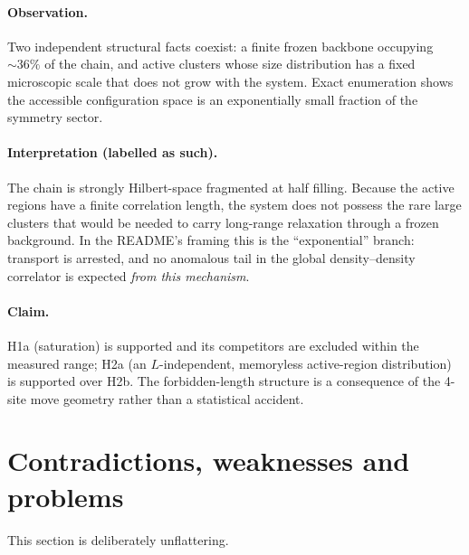 \documentclass[11pt,a4paper]{article}
\begin{document}
\paragraph{Observation.} Two independent structural facts coexist: a finite
frozen backbone occupying ${\sim}36\%$ of the chain, and active clusters
whose size distribution has a fixed microscopic scale that does not grow
with the system. Exact enumeration shows the accessible configuration space
is an exponentially small fraction of the symmetry sector.

\paragraph{Interpretation (labelled as such).} The chain is strongly
Hilbert-space fragmented at half filling. Because the active regions have a
finite correlation length, the system does not possess the rare large
clusters that would be needed to carry long-range relaxation through a
frozen background. In the README's framing this is the ``exponential''
branch: transport is arrested, and no anomalous tail in the global
density--density correlator is expected \emph{from this mechanism}.

\paragraph{Claim.} H1a (saturation) is supported and its competitors are
excluded within the measured range; H2a (an $L$-independent, memoryless
active-region distribution) is supported over H2b. The forbidden-length
structure is a consequence of the 4-site move geometry rather than a
statistical accident.

\section{Contradictions, weaknesses and problems}
\label{sec:problems}

This section is deliberately unflattering.
\end{document}
